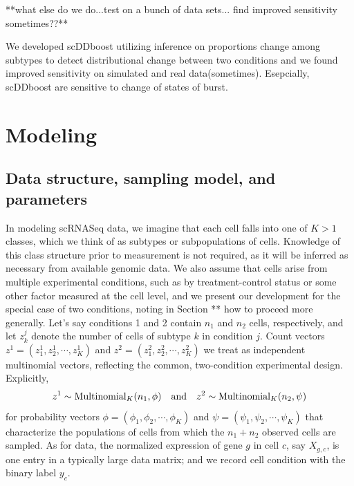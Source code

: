 \documentclass[11pt]{amsart}
\begin{document}
 **what else do we do...test on a bunch of data sets...
 find improved sensitivity sometimes??** 

We developed scDDboost utilizing inference on proportions change among subtypes to detect distributional change between two conditions 
and we found improved sensitivity on simulated and real data(sometimes). Esepcially, scDDboost 
are sensitive to change of states of burst.

\section{Modeling}
\subsection{Data structure, sampling model, and parameters}
In modeling scRNASeq data, we
imagine that each cell falls into one of $K>1$ classes, which we think of as
subtypes or subpopulations of cells.   Knowledge of this class structure
 prior to measurement is not required, as it will be inferred as necessary from
 available genomic data.  We also assume that cells arise from multiple
experimental conditions, such as by treatment-control status or some other factor
 measured at the cell level, and we present our development for the special
case of two conditions, noting in Section ** how to proceed more generally.
Let's say conditions 1 and 2 contain $n_1$ and $n_2$ cells, respectively, and
let $z^j_k$ denote the number of cells of subtype $k$ in condition $j$.
Count vectors $z^1 = (z^1_1, z^1_2, \cdots, z^1_K )$ and 
$z^2 = (z^2_1, z^2_2, \cdots, z^2_K)$ we treat as independent multinomial
vectors, reflecting the common, two-condition experimental design.
Explicitly,
\begin{eqnarray*}
z^1 \sim \text{Multinomial}_K( n_1, \phi ) \quad {\mbox {\rm and}} \quad
z^2 \sim \text{Multinomial}_K( n_2, \psi )
\end{eqnarray*}
for probability vectors 
$\phi = (\phi_1, \phi_2, \cdots, \phi_K)$ and 
 $\psi = ( \psi_1, \psi_2, \cdots, \psi_K)$ that characterize the populations of
cells from which the $n_1+n_2$ observed cells are sampled.
As for data, the 
normalized expression of gene $g$ in cell $c$, say $X_{g,c}$, is one entry
in a typically large data matrix; and we record cell condition with the binary
label $y_c$.   
\end{document}
